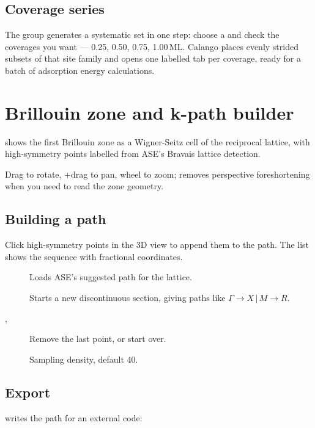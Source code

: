 \subsection{Coverage series}

The  group generates a systematic set in one step:
choose a  and check the coverages you want --- 0.25, 0.50,
0.75, 1.00\,ML. Calango places evenly strided subsets of that site family
and opens one labelled tab per coverage, ready for a batch of adsorption
energy calculations.

\section{Brillouin zone and k-path builder}
\label{sec:bz}

\menusep{} shows the first
Brillouin zone as a Wigner-Seitz cell of the reciprocal lattice, with
high-symmetry points labelled from ASE's Bravais lattice detection.

Drag to rotate, +drag to pan, wheel to zoom;
 removes perspective foreshortening when you
need to read the zone geometry.

\subsection{Building a path}

Click high-symmetry points in the 3D view to append them to the path. The
list shows the sequence with fractional coordinates.

\begin{description}
  \item[] Loads ASE's suggested path for the lattice.
  \item[] Starts a new discontinuous section, giving paths like
    $\Gamma \rightarrow X \,|\, M \rightarrow R$.
  \item[, ] Remove the last point, or start over.
  \item[] Sampling density, default 40.
\end{description}

\subsection{Export}

 writes the path for an external code:

